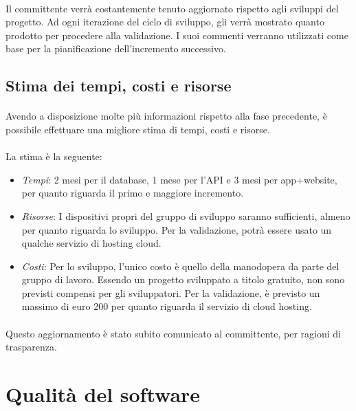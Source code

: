 \documentclass[11pt,a4paper,english]{article}
\begin{document}
\paragraph{} Il committente verrà costantemente tenuto aggiornato rispetto agli sviluppi del progetto. Ad ogni iterazione del ciclo di sviluppo, gli verrà mostrato quanto prodotto per procedere alla validazione. I suoi commenti verranno utilizzati come base per la pianificazione dell'incremento successivo.

\subsection{Stima dei tempi, costi e risorse}

\paragraph{} Avendo a disposizione molte più informazioni rispetto alla fase precedente, è possibile effettuare una migliore stima di tempi, costi e risorse. 

\paragraph{} La stima è la seguente:
\begin{itemize}
    \item \emph{Tempi}: 2 mesi per il database, 1 mese per l'API e 3 mesi per app+website, per quanto riguarda il primo e maggiore incremento. 
    \item \emph{Risorse}: I dispositivi propri del gruppo di sviluppo saranno sufficienti, almeno per quanto riguarda lo sviluppo. Per la validazione, potrà essere usato un qualche servizio di hosting cloud.
    \item \emph{Costi}: Per lo sviluppo, l'unico costo è quello della manodopera da parte del gruppo di lavoro. Essendo un progetto sviluppato a titolo gratuito, non sono previsti compensi per gli sviluppatori. Per la validazione, è previsto un massimo di euro 200 per quanto riguarda il servizio di cloud hosting. 
\end{itemize}

\paragraph{} Questo aggiornamento è stato subito comunicato al committente, per ragioni di trasparenza. 

\newpage
\section{Qualità del software}
\end{document}
